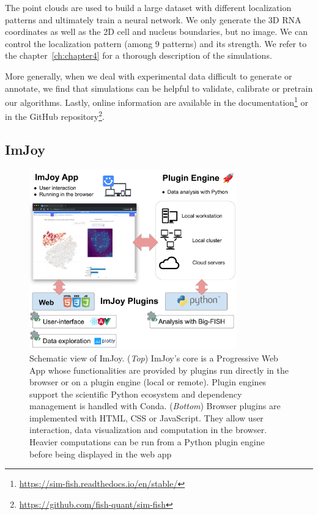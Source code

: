 The point clouds are used to build a large dataset with different localization patterns and ultimately train a neural network.
We only generate the 3D \ac{RNA} coordinates as well as the 2D cell and nucleus boundaries, but no image.
We can control the localization pattern (among 9 patterns) and its strength.
We refer to the chapter~\ref{ch:chapter4} for a thorough description of the simulations.

More generally, when we deal with experimental data difficult to generate or annotate, we find that simulations can be helpful to validate, calibrate or pretrain our algorithms.
Lastly, online information are available in the documentation\footnote{\url{https://sim-fish.readthedocs.io/en/stable/}} or in the GitHub repository\footnote{\url{https://github.com/fish-quant/sim-fish}}.

\subsection{ImJoy}
\label{subsec:imjoy}

\begin{figure}[h]
    \centering
    \includegraphics[width=0.8\textwidth]{figures/chapter1/schema_imjoy}
    \caption{Schematic view of ImJoy.
	(\textit{Top}) ImJoy's core is a Progressive Web App whose functionalities are provided by plugins run directly in the browser or on a plugin engine (local or remote).
	Plugin engines support the scientific Python ecosystem and dependency management is handled with Conda.
	(\textit{Bottom}) Browser plugins are implemented with HTML, CSS or JavaScript.
	They allow user interaction, data visualization and computation in the browser.
	Heavier computations can be run from a Python plugin engine before being displayed in the web app}
    \label{fig:imjoy}
\end{figure}

